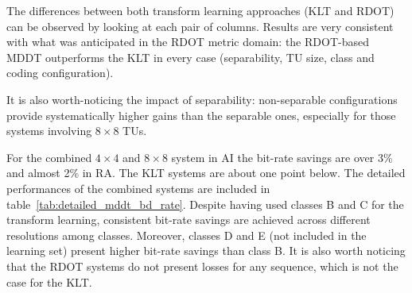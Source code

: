 \documentclass[11pt,a4paper,openright,twoside]{book}
\numberwithin{equation}{section} %
\numberwithin{figure}{section} %
\numberwithin{table}{section} %
\begin{document}
The differences between both transform learning approaches (\ac{KLT} and
\ac{RDOT}) can be observed by looking at each pair of columns.
Results are very consistent with what was anticipated in the \ac{RDOT} metric
domain:
the \ac{RDOT}-based \ac{MDDT} outperforms the \ac{KLT} in every case
(separability, \ac{TU} size, class and coding configuration).

It is also worth-noticing the impact of separability:
non-separable configurations provide systematically higher gains than the
separable ones, especially for those systems involving $8\times8$ \acp{TU}.

For the combined $4\times4$ and $8\times8$ system in \ac{AI} the bit-rate
savings are over 3\% and almost 2\% in \ac{RA}.
The \ac{KLT} systems are about one point below.
The detailed performances of the combined systems are included in
table~\ref{tab:detailed_mddt_bd_rate}.
Despite having used classes B and C for the transform learning, consistent
bit-rate savings are achieved across different resolutions among classes.
Moreover, classes D and E (not included in the learning set) present higher
bit-rate savings than class B.
It is also worth noticing that the \ac{RDOT} systems do not present losses for
any sequence, which is not the case for the \ac{KLT}.
\end{document}
